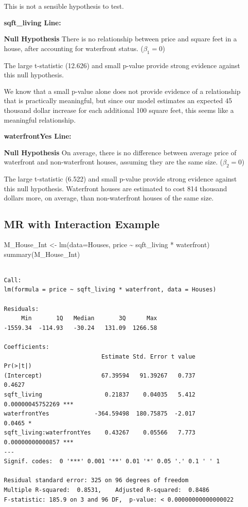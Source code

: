 \documentclass[
  letterpaper,
  DIV=11,
  numbers=noendperiod]{scrreprt}
\newenvironment{Shaded}{\begin{snugshade}}{\end{snugshade}}
\newcommand{\AttributeTok}[1]{\textcolor[rgb]{0.40,0.45,0.13}{#1}}
\newcommand{\FunctionTok}[1]{\textcolor[rgb]{0.28,0.35,0.67}{#1}}
\newcommand{\NormalTok}[1]{\textcolor[rgb]{0.00,0.23,0.31}{#1}}
\newcommand{\OtherTok}[1]{\textcolor[rgb]{0.00,0.23,0.31}{#1}}
\newcommand{\SpecialCharTok}[1]{\textcolor[rgb]{0.37,0.37,0.37}{#1}}
\begin{document}
This is not a sensible hypothesis to test.

\textbf{sqft\_living Line:}

\textbf{Null Hypothesis} There is no relationship between price and
square feet in a house, after accounting for waterfront status.
(\(\beta_1=0\))

The large t-statistic (12.626) and small p-value provide strong evidence
against this null hypothesis.

We know that a small p-value alone does not provide evidence of a
relationship that is practically meaningful, but since our model
estimates an expected 45 thousand dollar increase for each additional
100 square feet, this seems like a meaningful relationship.

\textbf{waterfrontYes Line:}

\textbf{Null Hypothesis} On average, there is no difference between
average price of waterfront and non-waterfront houses, assuming they are
the same size. (\(\beta_2=0\))

The large t-statistic (6.522) and small p-value provide strong evidence
against this null hypothesis. Waterfront houses are estimated to cost
814 thousand dollars more, on average, than non-waterfront houses of the
same size.

\subsection{MR with Interaction
Example}\label{mr-with-interaction-example}

\begin{Shaded}
\begin{Highlighting}[]
\NormalTok{M\_House\_Int }\OtherTok{\textless{}{-}} \FunctionTok{lm}\NormalTok{(}\AttributeTok{data=}\NormalTok{Houses, price }\SpecialCharTok{\textasciitilde{}}\NormalTok{ sqft\_living }\SpecialCharTok{*}\NormalTok{ waterfront)}
\FunctionTok{summary}\NormalTok{(M\_House\_Int)}
\end{Highlighting}
\end{Shaded}

\begin{verbatim}

Call:
lm(formula = price ~ sqft_living * waterfront, data = Houses)

Residuals:
     Min       1Q   Median       3Q      Max 
-1559.34  -114.93   -30.24   131.09  1266.58 

Coefficients:
                            Estimate Std. Error t value         Pr(>|t|)    
(Intercept)                 67.39594   91.39267   0.737           0.4627    
sqft_living                  0.21837    0.04035   5.412 0.00000045752269 ***
waterfrontYes             -364.59498  180.75875  -2.017           0.0465 *  
sqft_living:waterfrontYes    0.43267    0.05566   7.773 0.00000000000857 ***
---
Signif. codes:  0 '***' 0.001 '**' 0.01 '*' 0.05 '.' 0.1 ' ' 1

Residual standard error: 325 on 96 degrees of freedom
Multiple R-squared:  0.8531,    Adjusted R-squared:  0.8486 
F-statistic: 185.9 on 3 and 96 DF,  p-value: < 0.00000000000000022
\end{verbatim}
\end{document}
